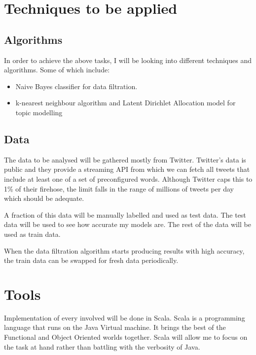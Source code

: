 \documentclass[12pt, a4paper]{article}
\begin{document}
\section{Techniques to be applied}
\subsection{Algorithms}
In order to achieve the above tasks, I will be looking into different techniques and algorithms.
Some of which include:
\begin{itemize}
  \item Naive Bayes classifier for data filtration.
  \item k-nearest neighbour algorithm and Latent Dirichlet Allocation model for topic modelling
\end{itemize}

\subsection{Data}
The data to be analysed will be gathered mostly from Twitter. Twitter's data is public and they
provide a streaming API from which we can fetch all tweets that include at least one of a set of
preconfigured words. Although Twitter caps this to 1\% of their firehose, the limit falls in the
range of millions of tweets per day which should be adequate.

A fraction of this data will be manually labelled and used as test data. The test data will be used
to see how accurate my models are. The rest of the data will be used as train data.

When the data filtration algorithm starts producing results with high accuracy, the train data can
be swapped for fresh data periodically.


\section{Tools}
Implementation of every involved will be done in Scala. Scala is a programming language that runs on
the Java Virtual machine. It brings the best of the Functional and Object Oriented worlds together.
Scala will allow me to focus on the task at hand rather than battling with the verbosity of Java.
\end{document}
